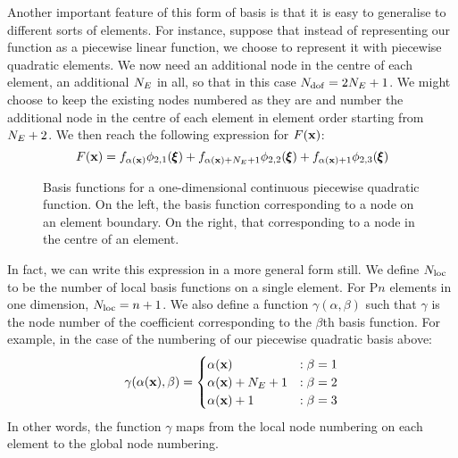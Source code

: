 \documentclass[a4paper, 11pt]{book}
\newcommand{\ifhtlatex}[2]{\ifthenelse{\boolean{HTLatex}}{#1}{#2}}
\newcommand{\xfig}[1]{
  \ifhtlatex{
    \texttt{[image: \#1.png]}
  }{
    
  }
}
\begin{document}
Another important feature of this form of basis is that it is easy to
generalise to different sorts of elements. For instance, suppose that
instead of representing our function as a piecewise linear function, we
choose to represent it with piecewise quadratic elements. We now need an
additional node in the centre of each element, an additional $N_E$ in all,
so that in this case $N_\mathrm{dof}=2N_E+1$. We might choose to keep the existing
nodes numbered as they are and number the additional node in the centre of
each element in element order starting from $N_E+2$. We then reach the
following expression for $F(\mathbf{x})$:
\begin{equation}
  F(\mathbf{x})= f_{\alpha(\mathbf{x})} \phi_{2,1}(\pmb{\xi}) 
  + f_{\alpha(\mathbf{x})+N_E+1}\phi_{2,2}(\pmb{\xi})
  + f_{\alpha(\mathbf{x})+1}\phi_{2,3}(\pmb{\xi})
\end{equation}
\begin{figure}[t]
  \centering
  \xfig{quadratic_1d_basis}
  \caption{Basis functions for a one-dimensional continuous piecewise
    quadratic function. On the left, the basis function corresponding to a
    node on an element boundary. On the right, that corresponding to a node
    in the centre of an element.}
\end{figure}
In fact, we can write this expression in a more general form still. We
define $N_\mathrm{loc}$ to be the number of local basis functions on a single
element. For P$n$ elements in one dimension, $N_\mathrm{loc}=n+1$. \label{gamma} We also define a
function $\gamma(\alpha, \beta)$ such that $\gamma$ is the node number of
the coefficient corresponding to the $\beta$th basis function. For example,
in the case of the numbering of our piecewise quadratic basis above:
\begin{equation}
  \gamma(\alpha(\mathbf{x}),\beta) = 
  \begin{cases}
    \alpha(\mathbf{x}) &: \beta=1\\
    \alpha(\mathbf{x})+N_E+1 &: \beta=2\\
    \alpha(\mathbf{x})+1 &: \beta=3
  \end{cases}
\end{equation}
In other words, the function $\gamma$ maps from the local node numbering on
each element to the global node numbering.
\end{document}
